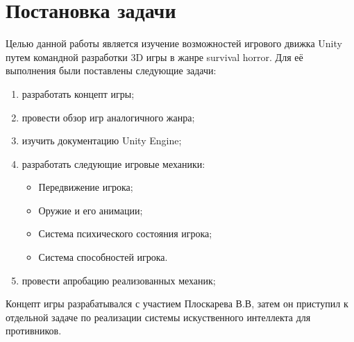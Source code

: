 
\section{Постановка задачи}
\label{sec:task}
Целью данной работы является изучение возможностей игрового движка Unity путем командной разработки 3D игры в жанре survival horror. Для её выполнения были поставлены следующие задачи:

 \begin{enumerate}
 \item  разработать концепт игры;
 \item  провести обзор игр аналогичного жанра;
 \item  изучить документацию Unity Engine;
 \item  разработать следующие игровые механики:
   \begin{itemize}
   \item  Передвижение игрока;
   \item  Оружие и его анимации;
   \item  Система психического состояния игрока;
   \item  Система способностей игрока.
   \end{itemize}
 \item  провести апробацию реализованных механик;  
 \end{enumerate}

 Концепт игры разрабатывался с участием Плоскарева В.В, затем он приступил к отдельной задаче по реализации системы искуственного интеллекта для противников.
